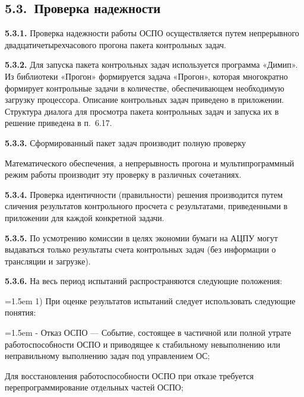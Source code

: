 \documentclass[11pt,a4paper]{article}
\begin{document}
\subsection*{5.3.~Проверка надежности}
\par\textbf{5.3.1.} Проверка надежности работы ОСПО осуществляется путем непрерывного двадцатичетырехчасового прогона пакета контрольных задач.\par
\par\textbf{5.3.2.} Для запуска пакета контрольных задач используется программа «Димип». Из библиотеки «Прогон» формируется задача «Прогон», которая многократно формирует контрольные задачи в количестве, обеспечивающем необходимую загрузку процессора. Описание контрольных задач приведено в приложении. Структура диалога для просмотра пакета контрольных задач и запуска их в решение приведена в п.~6.17.\par
\par\textbf{5.3.3.} Сформированный пакет задач производит полную проверку\par
Математического обеспечения, а непрерывность прогона и мультипрограммный режим работы производит эту проверку в различных сочетаниях.

\par\textbf{5.3.4.} Проверка идентичности (правильности) решения производится путем сличения результатов контрольного просчета с результатами, приведенными в приложении для каждой конкретной задачи.\par
\par\textbf{5.3.5.} По усмотрению комиссии в целях экономии бумаги на АЦПУ могут выдаваться только результаты счета контрольных задач (без информации о трансляции и загрузке).\par
\par\textbf{5.3.6.} На весь период испытаний распространяются следующие положения:\par
\par\hangindent=1.5em 1) При оценке результатов испытаний следует использовать следующие понятия:\par
\par\hangindent=1.5em - Отказ ОСПО --- Событие, состоящее в частичной или полной утрате работоспособности ОСПО и приводящее к стабильному невыполнению или неправильному выполнению задач под управлением ОС;\par
Для восстановления работоспособности ОСПО при отказе требуется перепрограммирование отдельных частей ОСПО;
\end{document}
